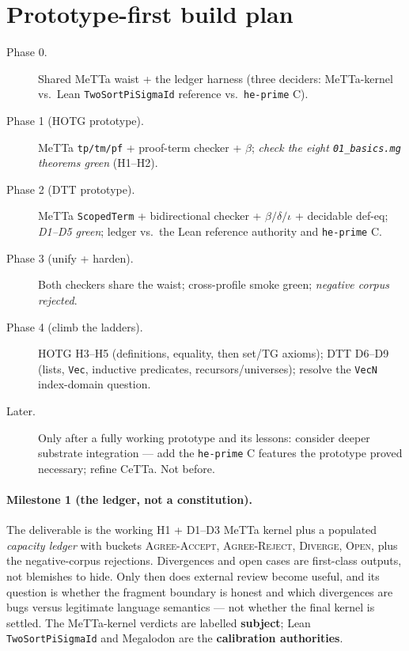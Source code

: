 \documentclass[11pt]{article}
\newcommand{\MeTTa}{MeTTa}
\newcommand{\CeTTa}{CeTTa}
\newcommand{\HOTG}{HOTG}
\newcommand{\DTT}{DTT}
\newcommand{\code}[1]{\texttt{#1}}
\begin{document}
\section{Prototype-first build plan}
\label{sec:plan}

\begin{description}
\item[Phase 0.] Shared \MeTTa{} waist + the ledger harness (three deciders:
  \MeTTa{}-kernel vs.\ Lean \code{TwoSortPiSigmaId} reference vs.\ \code{he-prime} C).
\item[Phase 1 (\HOTG{} prototype).] \MeTTa{} \code{tp/tm/pf} + proof-term checker +
  $\beta$; \emph{check the eight \code{01\_basics.mg} theorems green} (H1--H2).
\item[Phase 2 (\DTT{} prototype).] \MeTTa{} \code{ScopedTerm} + bidirectional checker +
  $\beta/\delta/\iota$ + decidable def-eq; \emph{D1--D5 green}; ledger vs.\ the Lean
  reference authority and \code{he-prime} C.
\item[Phase 3 (unify + harden).] Both checkers share the waist; cross-profile smoke
  green; \emph{negative corpus rejected}.
\item[Phase 4 (climb the ladders).] \HOTG{} H3--H5 (definitions, equality, then
  set/TG axioms); \DTT{} D6--D9 (lists, \code{Vec}, inductive predicates,
  recursors/universes); resolve the \code{VecN} index-domain question.
\item[Later.] Only after a fully working prototype and its lessons: consider deeper
  substrate integration --- add the \code{he-prime} C features the prototype proved
  necessary; refine \CeTTa{}. Not before.
\end{description}

\paragraph{Milestone 1 (the ledger, not a constitution).} The deliverable is the
working H1 + D1--D3 \MeTTa{} kernel plus a populated \emph{capacity ledger} with
buckets \textsc{Agree-Accept}, \textsc{Agree-Reject}, \textsc{Diverge},
\textsc{Open}, plus the negative-corpus rejections. Divergences and open cases are
first-class outputs, not blemishes to hide. Only then does external review become
useful, and its question is whether the fragment boundary is honest and which
divergences are bugs versus legitimate language semantics --- not whether the final
kernel is settled. The \MeTTa{}-kernel verdicts are labelled \textbf{subject}; Lean
\code{TwoSortPiSigmaId} and Megalodon are the \textbf{calibration authorities}.
\end{document}
